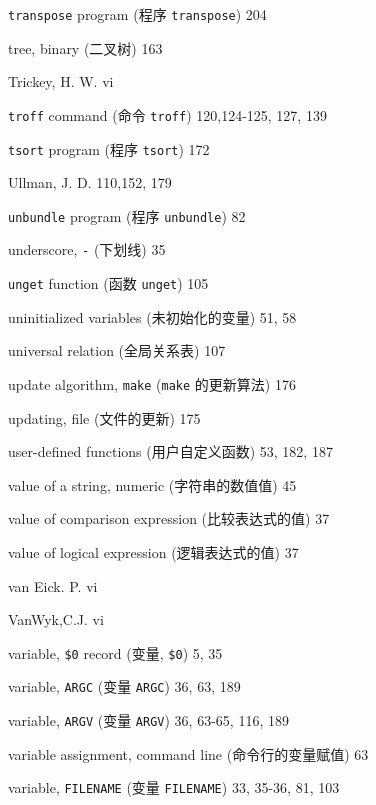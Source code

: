 \begin{multicols}{2}
\hangindent=2pc  \verb'transpose' program (程序
\verb'transpose') 204

\hangindent=2pc  tree, binary (二叉树) 163

\hangindent=2pc  Trickey, H. W. vi

\hangindent=2pc  \verb'troff' command (命令 \verb'troff')
120,124-125, 127, 139

\hangindent=2pc  \verb'tsort' program (程序 \verb'tsort') 172

\hangindent=2pc  Ullman, J. D. 110,152, 179

\hangindent=2pc  \verb'unbundle' program (程序 \verb'unbundle') 82

\hangindent=2pc  underscore, \verb'-' (下划线) 35

\hangindent=2pc  \verb'unget' function (函数 \verb'unget') 105

\hangindent=2pc  uninitialized variables (未初始化的变量) 51, 58

\hangindent=2pc  universal relation (全局关系表) 107

\hangindent=2pc  update algorithm, \verb'make' (\verb'make'
的更新算法) 176

\hangindent=2pc  updating, file (文件的更新) 175

\hangindent=2pc  user-defined functions (用户自定义函数) 
53, 182,  187

\hangindent=2pc  value of a string, numeric (字符串的数值值) 45

\hangindent=2pc  value of comparison expression (比较表达式的值) 37

\hangindent=2pc  value of logical expression (逻辑表达式的值) 37

\hangindent=2pc  van Eick. P. vi

\hangindent=2pc  VanWyk,C.J. vi

\hangindent=2pc  variable, \verb'$0' record (变量, \verb'$0') 5, 35

\hangindent=2pc  variable, \verb'ARGC' (变量 \verb'ARGC')
36, 63, 189

\hangindent=2pc  variable, \verb'ARGV' (变量 \verb'ARGV')
36, 63-65, 116, 189

\hangindent=2pc  variable assignment, command line
(命令行的变量赋值) 63

\hangindent=2pc  variable, \verb'FILENAME' (变量
\verb'FILENAME') 33, 35-36, 81, 103


\end{multicols}

